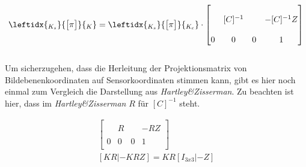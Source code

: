 		\begin{gather}
		\leftidx{_{K_{s}}}{\begin{bmatrix}
			\pi
			\end{bmatrix}}{_{K_{}}}
		=
		\leftidx{_{K_{s}}}{\begin{bmatrix}
			\pi
			\end{bmatrix}}{_{K_{c}}}
		\cdot
		\begin{bmatrix}
		&&&\\
		&[C]^{-1}&& -[C]^{-1} Z\\
		&&&\\
		0&0&0&1\\
		\end{bmatrix}
		\end{gather}\\
		
	Um sicherzugehen, dass die Herleitung der Projektionsmatrix von Bildebenenkoordinaten auf Sensorkoordinaten stimmen kann, gibt es hier noch einmal zum Vergleich die Darstellung aus \textit{Hartley\&Zisserman}\cite{HZ}. Zu beachten ist hier, dass im \textit{Hartley\&Zisserman} $R$ für $[C]^{-1}$ steht\cite{HZ}.
		
		\begin{gather}
		[K|0] \begin{bmatrix}
		&&&\\
		&R&&-RZ\\
		&&&\\
		0&0&0&1\\
		\end{bmatrix}\\
		[KR|-KRZ] = KR[I_{3x3}|-Z]
		\end{gather}
